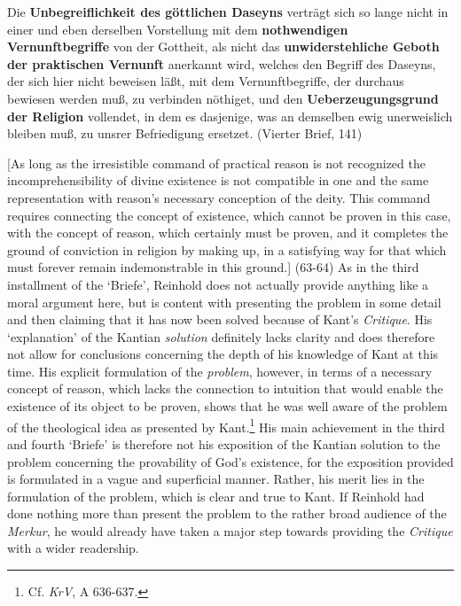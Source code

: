 Die \textbf{Unbegreiflichkeit des g\"{o}ttlichen Daseyns} vertr\"{a}gt sich so lange nicht in einer und eben derselben Vorstellung mit dem \textbf{nothwendigen Vernunftbegriffe }von der Gottheit, als nicht das \textbf{unwiderstehliche Geboth der praktischen Vernunft }anerkannt wird, welches den Begriff des Daseyns, der sich hier nicht beweisen l\"{a}\ss{}t, mit dem Vernunftbegriffe, der durchaus bewiesen werden mu\ss{}, zu verbinden n\"{o}thiget, und den \textbf{Ueberzeugungsgrund der Religion} vollendet, in dem es dasjenige, was an demselben ewig unerweislich bleiben mu\ss{}, zu unsrer Befriedigung ersetzet. (Vierter Brief, 141)

[As long as the irresistible command of practical reason is not recognized the incomprehensibility of divine existence is not compatible in one and the same representation with reason's necessary conception of the deity. This command requires connecting the concept of existence, which cannot be proven in this case, with the concept of reason, which certainly must be proven, and it completes the ground of conviction in religion by making up, in a satisfying way for that which must forever remain indemonstrable in this ground.] (63{-}64)  As in the third installment of the `Briefe', Reinhold does not actually provide anything like a moral argument here, but is content with presenting the problem in some detail and then claiming that it has now been solved because of Kant's \textit{Critique}. His `explanation' of the Kantian \textit{solution} definitely lacks clarity and does therefore not allow for conclusions concerning the depth of his knowledge of Kant at this time. His explicit formulation of the \textit{problem}, however, in terms of a necessary concept of reason, which lacks the connection to intuition that would enable the existence of its object to be proven, shows that he was well aware of the problem of the theological idea as presented by Kant.\footnote{ Cf. \textit{KrV}, A 636{-}637. } His main achievement in the third and fourth `Briefe' is therefore not his exposition of the Kantian solution to the problem concerning the provability of God's existence, for the exposition provided is formulated in a vague and superficial manner. Rather, his merit lies in the formulation of the problem, which is clear and true to Kant. If Reinhold had done nothing more than present the problem to the rather broad audience of the \textit{Merkur}, he would already have taken a major step towards providing the \textit{Critique} with a wider readership. 

